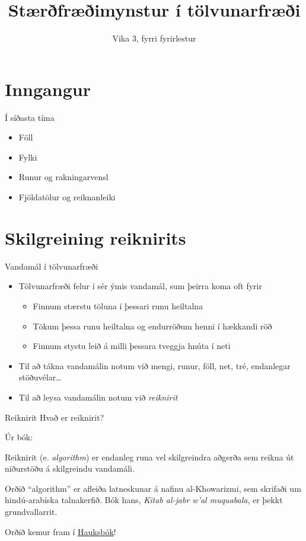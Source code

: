 \documentclass{beamer}
\title{Stærðfræðimynstur í tölvunarfræði}
\subtitle{Vika 3, fyrri fyrirlestur}
\begin{document}
\begin{frame}
\titlepage
\end{frame}

\section{Inngangur}

\begin{frame}{Í síðasta tíma}
\begin{itemize}
 \item Föll
 \item Fylki
 \item Runur og rakningarvensl
 \item Fjöldatölur og reiknanleiki
\end{itemize}
\end{frame}

\section{Skilgreining reiknirits}

\begin{frame}{Vandamál í tölvunarfræði}
\begin{itemize}
 \item Tölvunarfræði felur í sér ýmis vandamál, sum þeirra koma oft fyrir
 \begin{itemize}
  \item Finnum stærstu töluna í þessari runu heiltalna
  \item Tökum þessa runu heiltalna og endurröðum henni í hækkandi röð
  \item Finnum stystu leið á milli þessara tveggja hnúta í neti
 \end{itemize}
 \item Til að tákna vandamálin notum við mengi, runur, föll, net, tré, endanlegar stöðuvélar\ldots
 \item Til að leysa vandamálin notum við \emph{reiknirit}
\end{itemize}
\end{frame}

\begin{frame}{Reiknirit}
Hvað er reiknirit? \pause

Úr bók:
\begin{tcolorbox}[title=Reiknirit]
Reiknirit (e. \emph{algorithm}) er endanleg runa vel skilgreindra aðgerða sem reikna út niðurstöðu á skilgreindu vandamáli.
\end{tcolorbox}

Orðið ``algorithm'' er afleiða latneskunar á nafinu al-Khowarizmi, sem skrifaði um hindú-arabíska talnakerfið. Bók hans, \emph{Kitab al-jabr w'al muquabala}, er þekkt grundvallarrit.

\pause
Orðið kemur fram í \href{https://en.wikipedia.org/wiki/Hauksb\%C3\%B3k}{Hauksbók}!
\end{frame}
\end{document}
